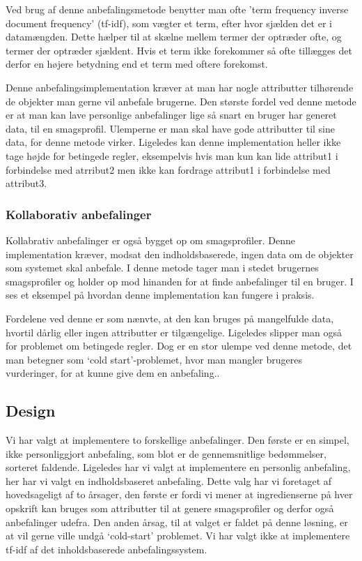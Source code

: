 Ved brug af denne anbefalingsmetode benytter man ofte 'term frequency inverse document frequency' (tf-idf), som vægter et term, efter hvor sjælden det er i datamængden.
Dette hælper til at skælne mellem termer der optræder ofte, og termer der optræder sjældent.
Hvis et term ikke forekommer så ofte tillægges det derfor en højere betydning end et term med oftere forekomst.

Denne anbefalingsimplementation kræver at man har nogle attributter tilhørende de objekter man gerne vil anbefale brugerne.
Den største fordel ved denne metode  er at man kan lave personlige anbefalinger lige så snart en bruger har generet data, til en smagsprofil.
Ulemperne er man skal have gode attributter til sine data, for denne metode virker. Ligeledes kan denne implementation heller ikke tage højde for betingede regler, eksempelvis hvis man kun kan lide attribut1 i forbindelse med atrribut2 men ikke kan fordrage attribut1 i forbindelse med attribut3.


\subsubsection{Kollaborativ anbefalinger}
Kollabrativ anbefalinger er også bygget op om smagsprofiler.
Denne implementation kræver, modsat den indholdsbaserede, ingen data om de objekter som systemet skal anbefale. I denne metode tager man i stedet brugernes smagsprofiler og holder op mod hinanden for at finde anbefalinger til en bruger.
I  ses et eksempel på hvordan denne implementation kan fungere i praksis.

Fordelene ved denne er som nænvte, at den kan bruges på mangelfulde data, hvortil dårlig eller ingen attributter er tilgængelige.
Ligeledes slipper man også for problemet om betingede regler.
Dog er en stor ulempe ved denne metode, det man betegner som ‘cold start’-problemet, hvor man mangler brugeres vurderinger, for at kunne give dem en anbefaling.\citep{RecommenderSystems}.


\subsection{Design}
Vi har valgt at implementere to forskellige anbefalinger.
Den første er en simpel, ikke personliggjort anbefaling, som blot er de gennemsnitlige bedømmelser, sorteret faldende.
Ligeledes har vi valgt at implementere en personlig anbefaling, her har vi valgt en indholdsbaseret anbefaling.
Dette valg har vi foretaget af hovedsageligt af to årsager, den første er fordi vi mener at ingredienserne på hver opskrift kan bruges som attributter til at genere smagsprofiler og derfor også anbefalinger udefra.
Den anden årsag, til at valget er faldet på denne løsning, er at vil gerne ville undgå ‘cold-start’ problemet.
Vi har valgt ikke at implementere tf-idf af det inholdsbaserede anbefalingssystem.

